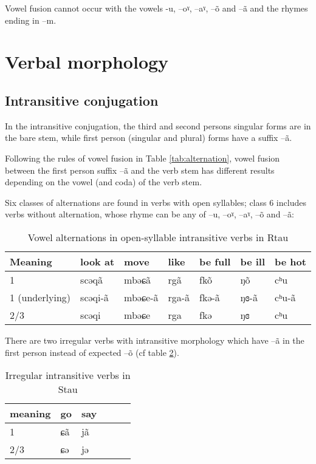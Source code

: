 \documentclass[oneside,a4paper,11pt]{article}
\newcommand{\ipa}[1]{{\phon #1}} %
\begin{document}
Vowel fusion cannot occur with the vowels -\ipa{u}, --\ipa{oˠ}, --\ipa{aˠ}, --\ipa{õ} and --\ipa{ã} and the rhymes ending in \ipa{--m}.
 
\section{Verbal morphology}


\subsection{Intransitive conjugation}
In the intransitive conjugation, the third and second persons singular forms are in the bare stem, while first person (singular and plural) forms have a suffix \ipa{--ã}.

Following the rules of  vowel fusion in Table \ref{tab:alternation}, vowel fusion between the first person suffix \ipa{--ã} and the verb stem has different results depending on the vowel (and coda) of the verb stem. 
 
Six classes of alternations are found in verbs with open syllables; class 6 includes verbs without alternation, whose rhyme can be any of --\ipa{u}, --\ipa{oˠ}, --\ipa{aˠ}, --\ipa{õ} and --\ipa{ã}:
\begin{table}[H]
\caption{Vowel alternations in open-syllable intransitive verbs in Rtau} \label{tab:open.intr} \centering
\begin{tabular}{llll|ll|l}
\toprule
Meaning &	look at   &  	move   &  	like&  	be full     &  	 	be ill      &  	be hot       \\  
\midrule
1&	\ipa{scəqã} & 	\ipa{mbəɕã} & \ipa{rgã} &	\ipa{fkõ} & 	  	\ipa{ŋõ} & 	   	\ipa{cʰu}   \\ 
1 (underlying)&	\ipa{scəqi-ã} & 	\ipa{mbəɕe-ã} & \ipa{rga-ã} &	\ipa{fkə-ã} & 	  	\ipa{ŋɞ-ã} & 	   	\ipa{cʰu-ã}   \\ 
2/3&	\ipa{scəqi} & 	\ipa{mbəɕe} & \ipa{rga} & 	\ipa{fkə} & 	  	\ipa{ŋɞ} & 	 	\ipa{cʰu}  \\ 
\bottomrule
\end{tabular}
\end{table}


There are two irregular verbs with intransitive morphology  which have \ipa{--ã} in the first person instead of expected \ipa{--õ} (cf table \ref{tab:irr.intr}). 

\begin{table}[H]
\caption{Irregular intransitive verbs in Stau} \label{tab:irr.intr} \centering
\begin{tabular}{llllll}
\toprule
meaning &	go     & say &\\  
\midrule
1&	\ipa{ɕã}  	 &\ipa{jã} &\\ 
2/3&	\ipa{ɕə} & 	\ipa{jə} &\\ 
\bottomrule
\end{tabular}
\end{table}
\end{document}
